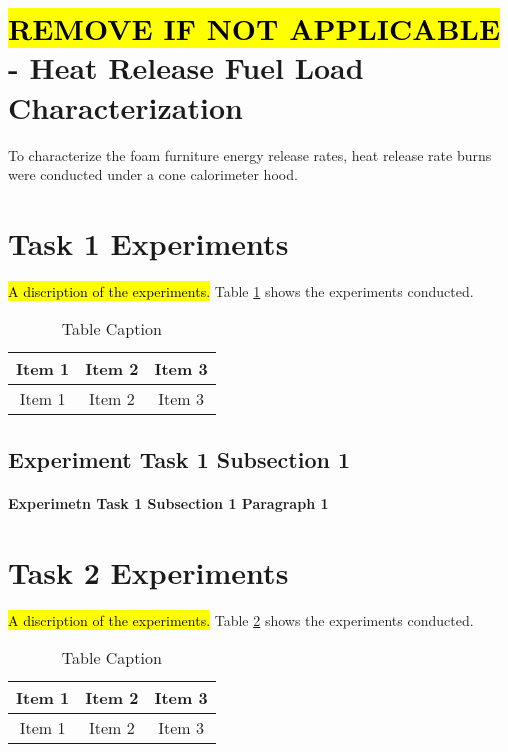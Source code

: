 \documentclass{article}
\begin{document}
\section{\hl{REMOVE IF NOT APPLICABLE} - Heat Release Fuel Load Characterization} \mbox{}

To characterize the foam furniture energy release rates, heat release rate burns were conducted under a cone calorimeter hood. 

\section{Task 1 Experiments}
\hl{A discription of the experiments.} Table \ref{table:Task_1_Experiments} shows the experiments conducted. 

\begin{table}[H]
	\centering
	\caption{Table Caption}
	\begin{tabular}{|c|c|c|}
		\hline
		Item 1 & Item 2 & Item 3 \\ \hline \hline
		Item 1 & Item 2 & Item 3 \\ \hline
	\end{tabular}
	\label{table:Task_1_Experiments}
\end{table}

\subsection{Experiment Task 1 Subsection 1} 
\paragraph{Experimetn Task 1 Subsection 1 Paragraph 1} \mbox{}

\section{Task 2 Experiments} \label{SingleStoryExp}

\hl{A discription of the experiments.} Table \ref{table:Task_2_Experiments} shows the experiments conducted. 

\begin{table}[H]
	\centering
	\caption{Table Caption}
	\begin{tabular}{|c|c|c|}
		\hline
		Item 1 & Item 2 & Item 3 \\ \hline \hline
		Item 1 & Item 2 & Item 3 \\ \hline
	\end{tabular}
	\label{table:Task_2_Experiments}
\end{table}
\end{document}
